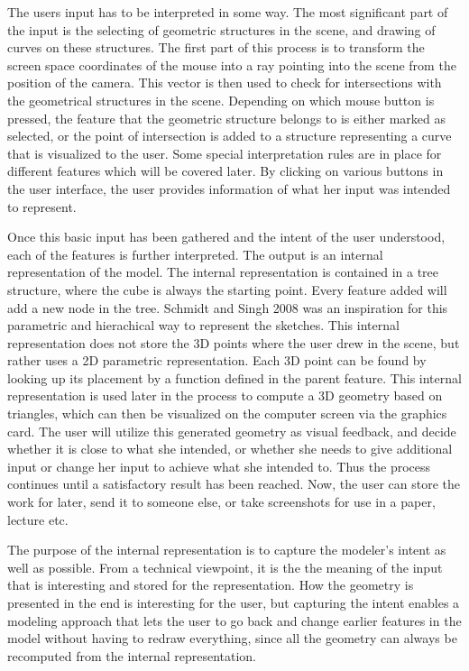 \documentclass[a4paper,12pt]{report}
\begin{document}
The users input has to be interpreted in some way. The most significant part of the input is the selecting of geometric structures in the scene, and drawing of curves on these structures. The first part of this process is to transform the screen space coordinates of the mouse into a ray pointing into the scene from the position of the camera. This vector is then used to check for intersections with the geometrical structures in the scene. Depending on which mouse button is pressed, the feature that the geometric structure belongs to is either marked as selected, or the point of intersection is added to a structure representing a curve that is visualized to the user. Some special interpretation rules are in place for different features which will be covered later. By clicking on various buttons in the user interface, the user provides information of what her input was intended to represent.

Once this basic input has been gathered and the intent of the user understood, each of the features is further interpreted. The output is an internal representation of the model. The internal representation is contained in a tree structure, where the cube is always the starting point.  Every feature added will add a new node in the tree. Schmidt and Singh 2008 \cite{CGF:CGF1129} was an inspiration for this parametric and hierachical way to represent the sketches. This internal representation does not store the 3D points where the user drew in the scene, but rather uses a 2D parametric representation. Each 3D point can be found by looking up its placement by a function defined in the parent feature. This internal representation is used later in the process to compute a 3D geometry based on triangles, which can then be visualized on the computer screen via the graphics card. The user will utilize this generated geometry as visual feedback, and decide whether it is close to 
what she intended, or whether she needs to give additional input or change her input to achieve what she intended to. Thus the process continues until a satisfactory result has been reached. Now, the user can store the work for later, send it to someone else, or take screenshots for use in a paper, lecture etc.




The purpose of the internal representation is to capture the modeler's intent as well as possible. From a technical viewpoint, it is the the meaning of the input that is interesting and stored for the representation. How the geometry is presented in the end is interesting for the user, but capturing the intent enables a modeling approach that lets the user to go back and change earlier features in the model without having to redraw everything, since all the geometry can always be recomputed from the internal representation.
\end{document}
